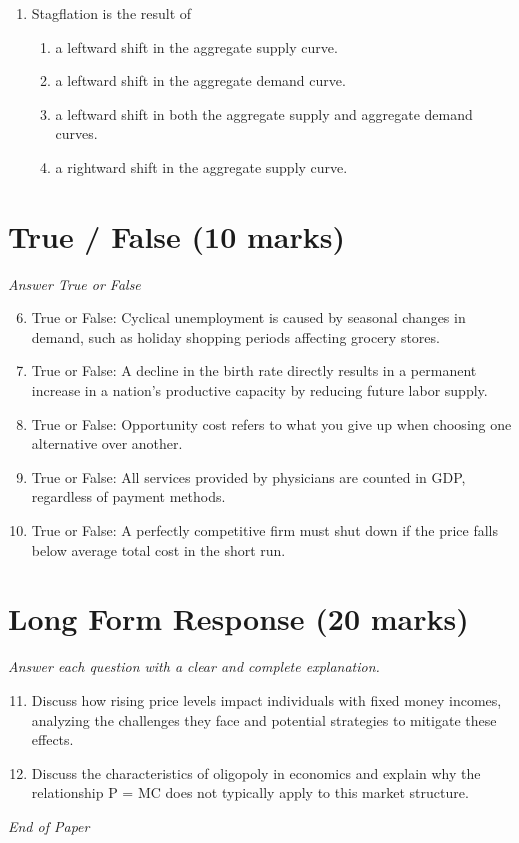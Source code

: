 \documentclass[12pt]{article}
\begin{document}
\begin{enumerate}[label=\arabic*.]
\begin{enumerate}[label=(\alph*)]
    \item Increases aggregate demand which increases real GDP and increases employment.
    \item Increases unemployment but low prices negate this effect.
    \item It keeps interest rates high which attracts foreign investment.
\end{enumerate}
\item Stagflation is the result of
\begin{enumerate}[label=(\alph*)]
    \item a leftward shift in the aggregate supply curve.
    \item a leftward shift in the aggregate demand curve.
    \item a leftward shift in both the aggregate supply and aggregate demand curves.
    \item a rightward shift in the aggregate supply curve.
\end{enumerate}
\end{enumerate}

\section*{True / False (10 marks)}
\textit{Answer True or False}
\begin{enumerate}[label=\arabic*.]
\setcounter{enumi}{5}
\item True or False: Cyclical unemployment is caused by seasonal changes in demand, such as holiday shopping periods affecting grocery stores.
\item True or False: A decline in the birth rate directly results in a permanent increase in a nation's productive capacity by reducing future labor supply.
\item True or False: Opportunity cost refers to what you give up when choosing one alternative over another.
\item True or False: All services provided by physicians are counted in GDP, regardless of payment methods.
\item True or False: A perfectly competitive firm must shut down if the price falls below average total cost in the short run.
\end{enumerate}

\section*{Long Form Response (20 marks)}
\textit{Answer each question with a clear and complete explanation.}
\begin{enumerate}[label=\arabic*.]
\setcounter{enumi}{10}
\item Discuss how rising price levels impact individuals with fixed money incomes, analyzing the challenges they face and potential strategies to mitigate these effects.
\item Discuss the characteristics of oligopoly in economics and explain why the relationship P = MC does not typically apply to this market structure.
\end{enumerate}

\vfill
\noindent\textit{End of Paper}
\end{document}
